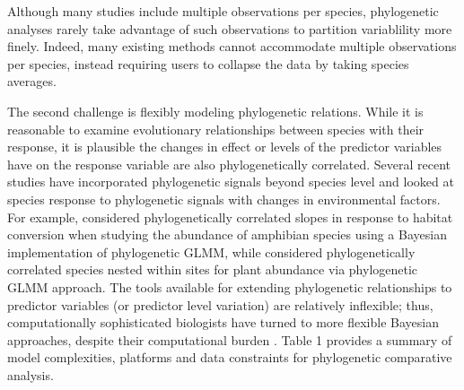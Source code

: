 \documentclass[12pt]{article}
\begin{document}
Although many studies include multiple observations per species, phylogenetic analyses rarely take advantage of such observations to partition variablility more finely.
Indeed, many existing methods cannot accommodate multiple observations per species, instead requiring users to collapse the data by taking species averages.


The second challenge is flexibly modeling phylogenetic relations.
While it is reasonable to examine evolutionary relationships between species with their response, it is plausible the changes in effect or levels of the predictor variables have on the response variable are also phylogenetically correlated. 
Several recent studies have incorporated phylogenetic signals beyond species level and looked at species response to phylogenetic signals with changes in environmental factors.
For example, \cite{nowakowski2018phylogenetic} considered phylogenetically correlated slopes in response to habitat conversion when studying the abundance of amphibian species using a Bayesian implementation of phylogenetic GLMM, while \cite{li2017canfun} considered phylogenetically correlated species nested within sites for plant abundance via phylogenetic GLMM approach. 
The tools available for extending phylogenetic relationships to predictor variables (or predictor level variation) are relatively inflexible; thus, computationally sophisticated biologists have turned to more flexible Bayesian approaches, despite their computational burden \citep{hadfield2010mcmc, burkner2016brms}.
Table 1 provides a summary of model complexities, platforms and data constraints for phylogenetic comparative analysis.

\newcommand{\pkg}[1]{{\tt #1}}
\newcommand{\code}[1]{{\tt #1}}
\end{document}
